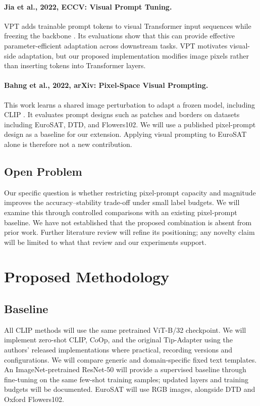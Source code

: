 \documentclass[11pt,letterpaper]{article}
\begin{document}
\paragraph{Jia et al., 2022, ECCV: Visual Prompt Tuning.}
VPT adds trainable prompt tokens to visual Transformer input sequences while freezing the backbone \cite{vpt}. Its evaluations show that this can provide effective parameter-efficient adaptation across downstream tasks. VPT motivates visual-side adaptation, but our proposed implementation modifies image pixels rather than inserting tokens into Transformer layers.

\paragraph{Bahng et al., 2022, arXiv: Pixel-Space Visual Prompting.}
This work learns a shared image perturbation to adapt a frozen model, including CLIP \cite{vp}. It evaluates prompt designs such as patches and borders on datasets including EuroSAT, DTD, and Flowers102. We will use a published pixel-prompt design as a baseline for our extension. Applying visual prompting to EuroSAT alone is therefore not a new contribution.

\subsection{Open Problem}

Our specific question is whether restricting pixel-prompt capacity and magnitude improves the accuracy--stability trade-off under small label budgets. We will examine this through controlled comparisons with an existing pixel-prompt baseline. We have not established that the proposed combination is absent from prior work. Further literature review will refine its positioning; any novelty claim will be limited to what that review and our experiments support.

\section{Proposed Methodology}
\subsection{Baseline}

All CLIP methods will use the same pretrained ViT-B/32 checkpoint. We will implement zero-shot CLIP, CoOp, and the original Tip-Adapter using the authors' released implementations where practical, recording versions and configurations. We will compare generic and domain-specific fixed text templates. An ImageNet-pretrained ResNet-50 will provide a supervised baseline through fine-tuning on the same few-shot training samples; updated layers and training budgets will be documented. EuroSAT will use RGB images, alongside DTD and Oxford Flowers102.
\end{document}
